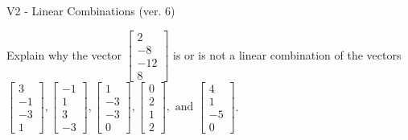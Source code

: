 \begin{exercise}
  \begin{exerciseTitle}V2 - Linear Combinations (ver. 6)\end{exerciseTitle}
  \begin{exerciseStatement}
    Explain why the vector \(\left[\begin{array}{c}
2 \\
-8 \\
-12 \\
8
\end{array}\right]\)  is or is not a linear 
	combination of the vectors \(\left[\begin{array}{c}
3 \\
-1 \\
-3 \\
1
\end{array}\right] , \left[\begin{array}{c}
-1 \\
1 \\
3 \\
-3
\end{array}\right] , \left[\begin{array}{c}
1 \\
-3 \\
-3 \\
0
\end{array}\right] , \left[\begin{array}{c}
0 \\
2 \\
1 \\
2
\end{array}\right] , \text{ and } \left[\begin{array}{c}
4 \\
1 \\
-5 \\
0
\end{array}\right]\).
	



\end{exerciseStatement}
\end{exercise}
